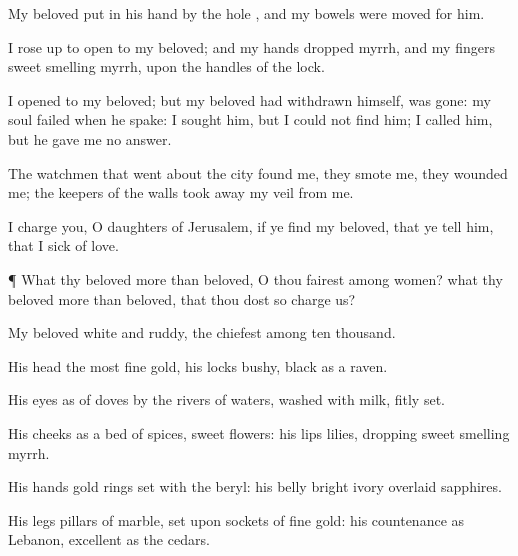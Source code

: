 {My
beloved put
in his
hand
by the
hole
{}, and my
bowels were
moved for him.

I rose
up to
open to my
beloved; and my
hands
dropped
{}
myrrh, and my
fingers
{} sweet
smelling
myrrh, upon the
handles of the
lock.

I
opened to my
beloved; but my
beloved had
withdrawn himself,
{} was
gone: my
soul
failed when he
spake: I
sought him, but I could not
find him; I
called him, but he gave me no
answer.

The
watchmen that went
about the
city
found me, they
smote me, they
wounded me; the
keepers of the
walls took
away my
veil from me.

I
charge you, O
daughters of
Jerusalem, if ye
find my
beloved, that ye
tell him, that I
{}
sick of
love.


\par }{\PP {}¶ What
{} thy
beloved more than
{}
beloved, O thou
fairest among
women? what
{} thy
beloved more than
{}
beloved, that
thou dost so
charge us?

My
beloved
{}
white and
ruddy, the
chiefest among ten
thousand.

His
head
{} the
most fine
gold, his
locks
{}
bushy,
{}
black as a
raven.

His
eyes
{} as
{} of
doves by the
rivers of
waters,
washed with
milk,
{} fitly
set.

His
cheeks
{} as a
bed of
spices,
{}
sweet
flowers: his
lips
{}
lilies,
dropping sweet
smelling
myrrh.

His
hands
{}
gold
rings
set with the
beryl: his
belly
{}
bright
ivory
overlaid
{}
sapphires.

His
legs
{}
pillars of
marble,
set upon
sockets of fine
gold: his
countenance
{} as
Lebanon,
excellent as the
cedars.

}
